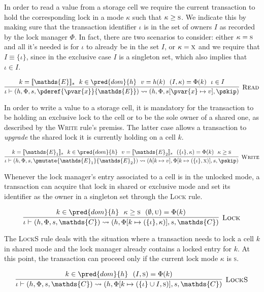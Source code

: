 In order to read a value from a storage cell we require the current transaction to hold the corresponding lock in a mode $\kappa$ such that $\kappa \geq \textsc{s}$. We indicate this by making sure that the transaction identifier $\iota$ is in the set of owners $I$ as recorded by the lock manager $\Phi$. In fact, there are two scenarios to consider: either $\kappa = \textsc{s}$ and all it's needed is for $\iota$ to already be in the set $I$, or $\kappa = \textsc{x}$ and we require that $I \equiv \{ \iota \}$, since in the exclusive case $I$ is a singleton set, which also implies that $\iota \in I$.

\[
\infer[\textsc{Read}]
{
	\iota \vdash (h, \Phi, s, \pderef{\pvar{x}}{\mathds{E}})
	\rightsquigarrow
	(h, \Phi, s[\pvar{x} \mapsto v], \pskip)
}
{
	k = \llbracket \mathds{E} \rrbracket_s\ \
	k \in \pred{dom}{h}\ \
	v = h(k)\ \
	(I, \kappa) = \Phi(k)\ \
	\iota \in I
}
\]

In order to write a value to a storage cell, it is mandatory for the transaction to be holding an exclusive lock to the cell or to be the sole owner of a shared one, as described by the \textsc{Write} rule's premiss. The latter case allows a transaction to \textit{upgrade} the shared lock it is currently holding on a cell $k$.

\[
\infer[\textsc{Write}]
{
	\iota \vdash (h, \Phi, s, \pmutate{\mathds{E}_1}{\mathds{E}_2})
	\rightsquigarrow
	(h[k \mapsto v], \Phi[k \mapsto (\{\iota\}, \textsc{x})], s, \pskip)
}
{
	k = \llbracket \mathds{E}_1 \rrbracket_s\ \
	k \in \pred{dom}{h}\ \
	v = \llbracket \mathds{E}_2 \rrbracket_s\ \
	(\{ \iota \}, \kappa) = \Phi(k)\ \
	\kappa \geq \textsc{s}
}
\]

Whenever the lock manager's entry associated to a cell is in the unlocked mode, a transaction can acquire that lock in shared or exclusive mode and set its identifier as the owner in a singleton set through the \textsc{Lock} rule.

\[
\infer[\textsc{Lock}]
{
	\iota \vdash (h, \Phi, s, \mathds{C})
	\rightsquigarrow
	(h, \Phi[k \mapsto (\{\iota\}, \kappa)], s, \mathds{C})
}
{
	k \in \pred{dom}{h}\ \
	\kappa \geq \textsc{s}\ \
	(\emptyset, \textsc{u}) = \Phi(k)
}
\]

The \textsc{LockS} rule deals with the situation where a transaction needs to lock a cell $k$ in shared mode and the lock manager already contains a locked entry for $k$. At this point, the transaction can proceed only if the current lock mode $\kappa$ is \textsc{s}.

\[
\infer[\textsc{LockS}]
{
	\iota \vdash (h, \Phi, s, \mathds{C})
	\rightsquigarrow
	(h, \Phi[k \mapsto (\{\iota\} \cup I, \textsc{s})], s, \mathds{C})
}
{
	k \in \pred{dom}{h}\ \
	(I, \textsc{s}) = \Phi(k)
}
\]

